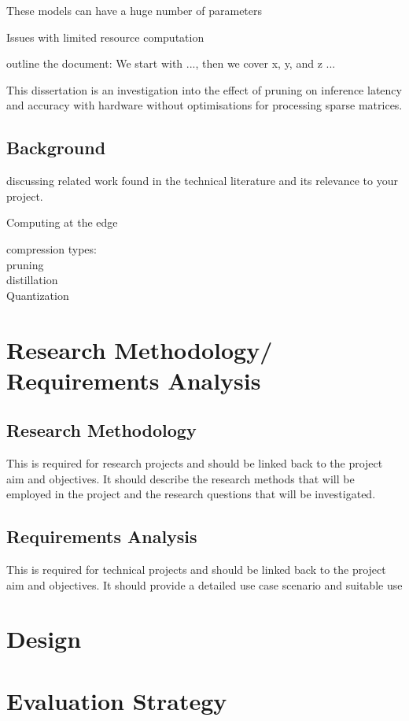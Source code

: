 \documentclass[11pt]{article}
\begin{document}
These models can have a huge number of parameters

\autocite{chenDeepLearningMobile2020}

Issues with limited resource computation

outline the document: We start with ..., then we cover x, y, and z ...

This dissertation is an investigation into the effect of pruning on inference latency and accuracy with 
hardware without optimisations for processing sparse matrices.

\subsection{Background}
discussing related work found in the technical literature and its relevance to your
project.

Computing at the edge

compression types:\\
pruning\\
distillation\\
Quantization\\


\section{Research Methodology/ Requirements Analysis}
\subsection{Research Methodology}
This is required for research projects and should be linked
back to the project aim and objectives. It should describe the research methods that
will be employed in the project and the research questions that will be investigated.

\subsection{Requirements Analysis}
This is required for technical projects and should be linked
back to the project aim and objectives. It should provide a detailed use case scenario
and suitable use

\section{Design}

\section{Evaluation Strategy}
\end{document}
